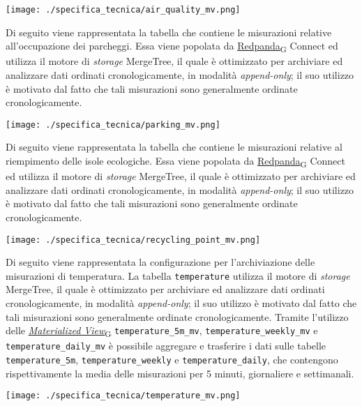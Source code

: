\begin{center}
	\texttt{[image: ./specifica\_tecnica/air\_quality\_mv.png]}
\end{center}
Di seguito viene rappresentata la tabella che contiene le misurazioni relative all'occupazione dei parcheggi. Essa viene popolata da \href{https://7last.github.io/docs/pb/documentazione-interna/glossario\#redpanda}{Redpanda\textsubscript{G}} Connect ed utilizza il motore di \textit{storage}
MergeTree, il quale è ottimizzato per archiviare ed analizzare dati ordinati cronologicamente, in modalità \textit{append-only}; il suo
utilizzo è motivato dal fatto che tali misurazioni sono generalmente ordinate cronologicamente.
\begin{center}
	\texttt{[image: ./specifica\_tecnica/parking\_mv.png]}
\end{center}
Di seguito viene rappresentata la tabella che contiene le misurazioni relative al riempimento delle isole ecologiche. Essa viene popolata da \href{https://7last.github.io/docs/pb/documentazione-interna/glossario\#redpanda}{Redpanda\textsubscript{G}} Connect ed utilizza il motore di \textit{storage}
MergeTree, il quale è ottimizzato per archiviare ed analizzare dati ordinati cronologicamente, in modalità \textit{append-only}; il suo
utilizzo è motivato dal fatto che tali misurazioni sono generalmente ordinate cronologicamente.
\begin{center}
	\texttt{[image: ./specifica\_tecnica/recycling\_point\_mv.png]}
\end{center}
Di seguito viene rappresentata la configurazione per l'archiviazione delle misurazioni di temperatura. La tabella \texttt{temperature} utilizza il motore di \textit{storage}
MergeTree, il quale è ottimizzato per archiviare ed analizzare dati ordinati cronologicamente, in modalità \textit{append-only}; il suo
utilizzo è motivato dal fatto che tali misurazioni sono generalmente ordinate cronologicamente.
Tramite l'utilizzo delle \href{https://7last.github.io/docs/pb/documentazione-interna/glossario\#materialized-view}{\textit{Materialized View}\textsubscript{G}} \texttt{temperature\_5m\_mv}, \texttt{temperature\_weekly\_mv} e \texttt{temperature\_daily\_mv}
è possibile aggregare e trasferire i dati sulle tabelle \texttt{temperature\_5m}, \texttt{temperature\_weekly} e \texttt{temperature\_daily},
che contengono rispettivamente la media delle misurazioni per 5 minuti, giornaliere e settimanali.
\begin{center}
	\texttt{[image: ./specifica\_tecnica/temperature\_mv.png]}
\end{center}

